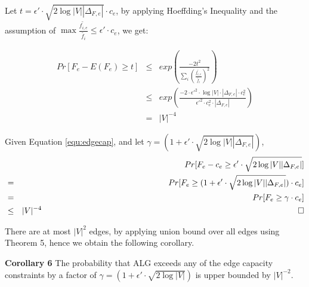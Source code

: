 \documentclass[conference]{IEEEtran}
\newcommand*{\QEDB}{\hfill\ensuremath{\square}}%
\begin{document}
Let $t=\epsilon' \cdot \sqrt{2\log|V||\Delta_{F,e}|} \cdot c_e$, by applying Hoeffding's Inequality and the assumption of $\max \frac{\tilde{f_{i,e}}}{\tilde{f_i}} \le \epsilon' \cdot c_e$, we get:

\begin{eqnarray}
Pr[F_e - E(F_e) \ge t] &\le& exp(\frac{-2t^2}{\sum_{i}(\frac{\tilde{f_{i,e}}}{\tilde{f_i}})^2}) \\ \nonumber
&\le& exp(\frac{-2 \cdot \epsilon'^2 \cdot \log|V| \cdot |\Delta_{F,e}| \cdot c_e^2}{\epsilon'^2 \cdot c_e^2 \cdot |\Delta_{F,e}|}) \\ \nonumber
&=& |V|^{-4}
\end{eqnarray}


Given Equation \ref{equ:edgecap}, and let $\gamma = (1+\epsilon' \cdot \sqrt{2\log|V||\Delta_{F,e}|})$,
\begin{eqnarray} \nonumber
&&Pr[F_e - c_e \ge \epsilon' \cdot \sqrt{2\log|V||\Delta_{F,e}|}] \\ \nonumber
&=& Pr[F_e \ge (1+\epsilon' \cdot \sqrt{2\log|V||\Delta_{F,e}|}) \cdot c_e] \\ \nonumber
&=& Pr[F_e \ge \gamma \cdot c_e] \\ \nonumber
&\le& |V|^{-4} \,\,\,\,\,\,\,\,\,\,\,\,\,\,\,\,\,\,\,\,\,\,\,\,\,\,\,\,\,\,\,\,\,\,\,\,\,\,\,\,\,\,\,\,\,\,\,\,\,\,\,\,\,\,\,\,\,\,\,\,\,\,\,\,\,\,\,\,\,\,\,\,\,\,\,\,\,\,\,\,\,\,\,\,\,\,\,\,\,\,\,\,\,\,\,\,\,\,\,\,\,\,\,\,\,\,\,\,\,\,\,\,\,\,\,\,\,\,\,\,\,\,\,\,\,\,\,\,\,\,\,\,\,\,\,\,\,\,\,\,\,\,\,\,\,\,\,\,\,\,\,\,\,\,\,\,\,\,\,\,\,\,\,\,\,\,\,\,\,\,\,\,\,\,\,\,\,\,\,\,\,\,\,\,\,\,\,\,\,\, \QEDB
\end{eqnarray}

%

There are at most $|V|^2$ edges, by applying union bound over all edges using Theorem 5, hence we obtain the following corollary.

\textbf{Corollary 6} The probability that ALG exceeds any of the edge capacity constraints by a factor of $\gamma = (1+\epsilon' \cdot \sqrt{2\log|V|})$ is upper bounded by $|V|^{-2}$.
\end{document}
